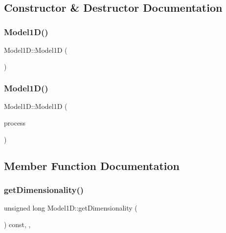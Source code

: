 \subsection{Constructor \& Destructor Documentation}
\hypertarget{class_model1_d_a4a4fa285bc474bd52d8a9bc1bc4f2dbf}{}\label{class_model1_d_a4a4fa285bc474bd52d8a9bc1bc4f2dbf} 
\subsubsection{\texorpdfstring{Model1\+D()}{Model1D()}\hspace{0.1cm}{\footnotesize\ttfamily [1/2]}}
{\footnotesize\ttfamily Model1\+D\+::\+Model1D (\begin{DoxyParamCaption}{ }\end{DoxyParamCaption})\hspace{0.3cm}{\ttfamily [default]}}

\hypertarget{class_model1_d_a0dcf861b2408b4254fb0176ef99e320c}{}\label{class_model1_d_a0dcf861b2408b4254fb0176ef99e320c} 
\subsubsection{\texorpdfstring{Model1\+D()}{Model1D()}\hspace{0.1cm}{\footnotesize\ttfamily [2/2]}}
{\footnotesize\ttfamily Model1\+D\+::\+Model1D (\begin{DoxyParamCaption}\item[{const shared\+\_\+ptr$<$ \hyperlink{class_stochastic_process}{Stochastic\+Process} $>$ \&}]{process }\end{DoxyParamCaption})\hspace{0.3cm}{\ttfamily [inline]}}



\subsection{Member Function Documentation}
\hypertarget{class_model1_d_ac81875523be6153cb58d0f37914eb9a1}{}\label{class_model1_d_ac81875523be6153cb58d0f37914eb9a1} 
\subsubsection{\texorpdfstring{get\+Dimensionality()}{getDimensionality()}}
{\footnotesize\ttfamily unsigned long Model1\+D\+::get\+Dimensionality (\begin{DoxyParamCaption}{ }\end{DoxyParamCaption}) const\hspace{0.3cm}{\ttfamily [inline]}, {\ttfamily [override]}, {\ttfamily [virtual]}}



